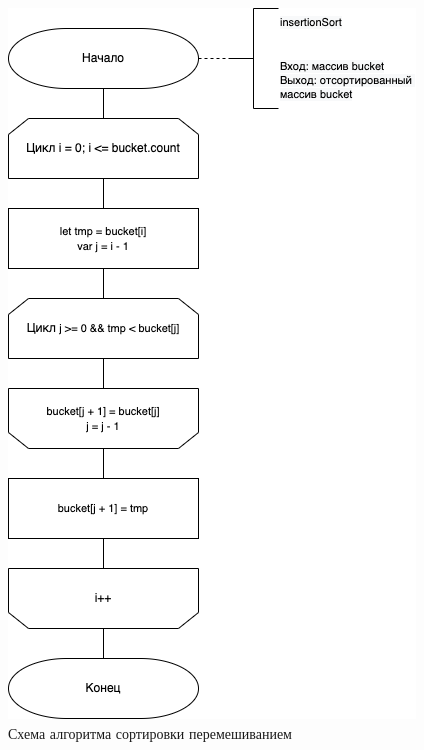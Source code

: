 \begin{figure}[h!]
	\centering
	\includegraphics[scale=0.8]{img/Insertion.png}
	\caption{Схема алгоритма сортировки перемешиванием}
	\label{fig:mpr}
\end{figure}

